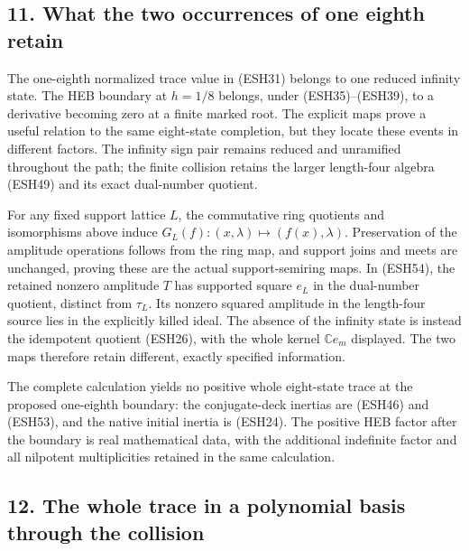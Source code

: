 \documentclass[
  10pt,
  a4paper,
]{article}
\begin{document}
\subsection{11. What the two occurrences of one eighth
retain}\label{what-the-two-occurrences-of-one-eighth-retain}

The one-eighth normalized trace value in (ESH31) belongs to one reduced
infinity state. The HEB boundary at \(h=1/8\) belongs, under
(ESH35)--(ESH39), to a derivative becoming zero at a finite marked root.
The explicit maps prove a useful relation to the same eight-state
completion, but they locate these events in different factors. The
infinity sign pair remains reduced and unramified throughout the path;
the finite collision retains the larger length-four algebra (ESH49) and
its exact dual-number quotient.

For any fixed support lattice \(L\), the commutative ring quotients and
isomorphisms above induce \(G_L(f):(x,\lambda)\mapsto(f(x),\lambda)\).
Preservation of the amplitude operations follows from the ring map, and
support joins and meets are unchanged, proving these are the actual
support-semiring maps. In (ESH54), the retained nonzero amplitude \(T\)
has supported square \(e_L\) in the dual-number quotient, distinct from
\(\tau_L\). Its nonzero squared amplitude in the length-four source lies
in the explicitly killed ideal. The absence of the infinity state is
instead the idempotent quotient (ESH26), with the whole kernel
\(\mathbb Ce_m\) displayed. The two maps therefore retain different,
exactly specified information.

The complete calculation yields no positive whole eight-state trace at
the proposed one-eighth boundary: the conjugate-deck inertias are
(ESH46) and (ESH53), and the native initial inertia is (ESH24). The
positive HEB factor after the boundary is real mathematical data, with
the additional indefinite factor and all nilpotent multiplicities
retained in the same calculation.

\subsection{12. The whole trace in a polynomial basis through the
collision}\label{the-whole-trace-in-a-polynomial-basis-through-the-collision}
\end{document}
